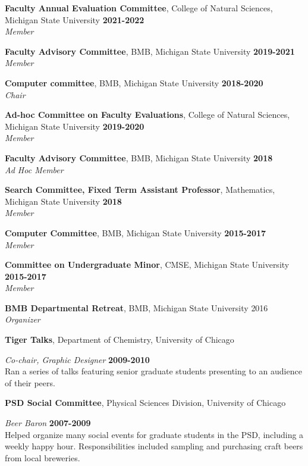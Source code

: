 \documentclass[margin,line]{res}
\begin{document}
\begin{resume}
        {\bf Faculty Annual Evaluation Committee}, College of Natural Sciences, Michigan State University \hfill {\bf 2021-2022}\\
        {\emph {Member}}

        {\bf Faculty Advisory Committee}, BMB, Michigan State University \hfill {\bf 2019-2021}\\
        {\emph {Member}}

        {\bf Computer committee}, BMB, Michigan State University \hfill {\bf 2018-2020}\\
        {\emph {Chair}}
     
        {\bf Ad-hoc Committee on Faculty Evaluations}, College of Natural Sciences, Michigan State University \hfill {\bf 2019-2020}\\
        {\emph {Member}}

        {\bf Faculty Advisory Committee}, BMB, Michigan State University \hfill {\bf 2018}\\
        {\emph {Ad Hoc Member}}

        {\bf Search Committee, Fixed Term Assistant Professor}, Mathematics, Michigan State University \hfill {\bf 2018}\\
        {\emph {Member}}
        
        {\bf Computer Committee}, BMB, Michigan State University \hfill {\bf 2015-2017}\\
        {\emph {Member}}

        {\bf Committee on Undergraduate Minor}, CMSE, Michigan State University \hfill {\bf 2015-2017}\\
        {\emph {Member}}

        {\bf BMB Departmental Retreat}, BMB, Michigan State University \hfill {2016} \\
        {\emph {Organizer}}

{\bf Tiger Talks}, Department of Chemistry, University of Chicago

\vspace{-.3cm}
{\em Co-chair, Graphic Designer} \hfill {\bf 2009-2010}\\
Ran a series of talks featuring senior graduate students presenting to an audience of their peers.

{\bf PSD Social Committee}, Physical Sciences Division, University of Chicago

\vspace{-.3cm}
{\em Beer Baron} \hfill {\bf 2007-2009}\\
Helped organize many social events for graduate students in the PSD, including a weekly happy
hour. Responsibilities included sampling and purchasing craft beers from local breweries.


\end{resume}
\end{document}
